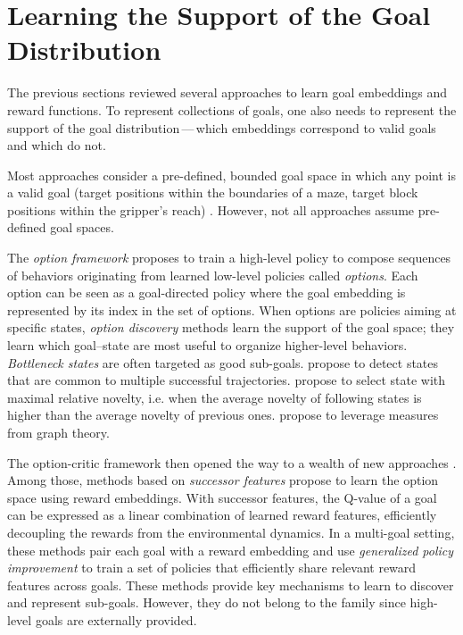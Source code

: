 \section{Learning the Support of the Goal Distribution}
The previous sections reviewed several approaches to learn goal embeddings and reward functions. To represent collections of goals, one also needs to represent the support of the goal distribution\,---\,which embeddings correspond to valid goals and which do not.

Most approaches consider a pre-defined, bounded goal space in which any point is a valid goal (\eg target positions within the boundaries of a maze, target block positions within the gripper's reach) \cite{schaul2015universal,andrychowicz2017hindsight,nair2017overcoming,plappert2018multi,curious,blaes2019control,lanier2019curiosity,ding_imitation_2019,li2019towards}. However, not all approaches assume pre-defined goal spaces. 

The \textit{option framework} \cite{sutton_between_1999,precup_temporal_2000} proposes to train a high-level policy to compose sequences of behaviors originating from learned low-level policies called \textit{options}. Each option can be seen as a goal-directed policy where the goal embedding is represented by its index in the set of options. When options are policies aiming at specific states, \textit{option discovery} methods learn the support of the goal space; they learn which goal--state are most useful to organize higher-level behaviors. \textit{Bottleneck states} are often targeted as good sub-goals. \cite{mcgovern_automatic_2001} propose to detect states that are common to multiple successful trajectories. \cite{simsek_using_2004} propose to select state with maximal relative novelty, i.e. when the average novelty of following states is higher than the average novelty of previous ones. \cite{simsek_skill_2008} propose to leverage measures from graph theory.

The option-critic framework then opened the way to a wealth of new approaches \cite{bacon2017option}. Among those, methods based on \textit{successor features} \cite{NIPS2017_350db081,barreto2020fast,ramesh_successor_2019} propose to learn the option space using reward embeddings. With successor features, the Q-value of a goal can be expressed as a linear combination of learned reward features, efficiently decoupling the rewards from the environmental dynamics. In a multi-goal setting, these methods pair each goal with a reward embedding and use \textit{generalized policy improvement} to train a set of policies that efficiently share relevant reward features across goals. These methods provide key mechanisms to learn to discover and represent sub-goals. However, they do not belong to the \rlimgep family since high-level goals are externally provided.

